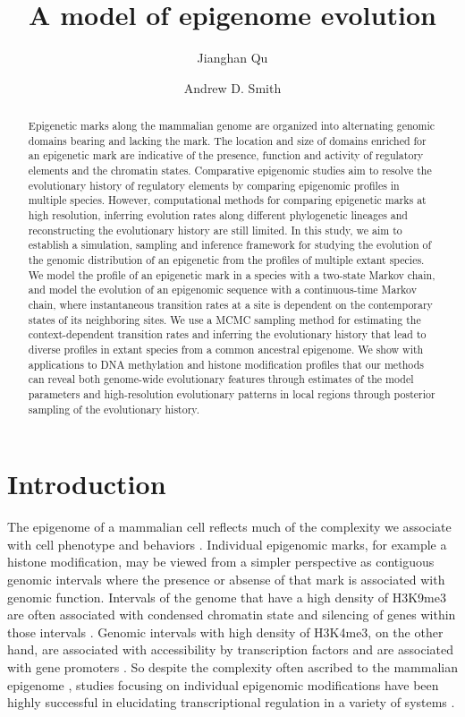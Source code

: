 \documentclass[11pt]{article}
\title{A model of epigenome evolution}
\author{Jianghan Qu \and Andrew D. Smith}
\begin{document}
\maketitle

\begin{abstract}
  Epigenetic marks along the mammalian genome are organized into
  alternating genomic domains bearing and lacking the mark. The
  location and size of domains enriched for an epigenetic mark are
  indicative of the presence, function and activity of regulatory
  elements and the chromatin states. Comparative epigenomic studies
  aim to resolve the evolutionary history of regulatory elements by
  comparing epigenomic profiles in multiple species.  However,
  computational methods for comparing epigenetic marks at high
  resolution, inferring evolution rates along different phylogenetic
  lineages and reconstructing the evolutionary history are still
  limited.  In this study, we aim to establish a simulation, sampling
  and inference framework for studying the evolution of the genomic
  distribution of an epigenetic from the profiles of multiple extant
  species.  We model the profile of an epigenetic mark in a species
  with a two-state Markov chain, and model the evolution of an
  epigenomic sequence with a continuous-time Markov chain, where
  instantaneous transition rates at a site is dependent on the
  contemporary states of its neighboring sites. We use a MCMC sampling
  method for estimating the context-dependent transition rates and
  inferring the evolutionary history that lead to diverse profiles in
  extant species from a common ancestral epigenome.  We show with
  applications to DNA methylation and histone modification profiles
  that our methods can reveal both genome-wide evolutionary features
  through estimates of the model parameters and high-resolution
  evolutionary patterns in local regions through posterior sampling of
  the evolutionary history.
\end{abstract}

\section{Introduction}

The epigenome of a mammalian cell reflects much of the complexity we
associate with cell phenotype and behaviors \cite{}. Individual
epigenomic marks, for example a histone modification, may be viewed
from a simpler perspective as contiguous genomic intervals where the
presence or absense of that mark is associated with genomic
function. Intervals of the genome that have a high density of H3K9me3
are often associated with condensed chromatin state and silencing of
genes within those intervals
\cite{nakayama2001role}. Genomic intervals with high
density of H3K4me3, on the other hand, are associated with
accessibility by transcription factors and are associated with gene
promoters \cite{santos2002active}. So despite the complexity often
ascribed to the mammalian epigenome \cite{bernstein2007mammalian},
studies focusing on individual epigenomic modifications have been
highly successful in elucidating transcriptional regulation in a
variety of systems \cite{martin2005diverse}.
\end{document}
